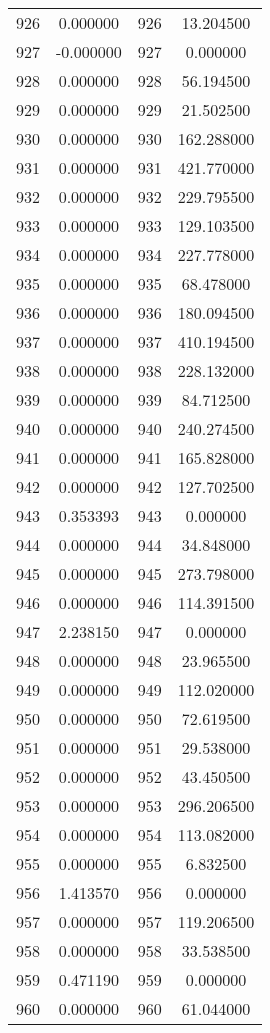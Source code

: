 \documentclass[12pt]{article}
\begin{document}
\begin{longtable}{@{}cccc@{}}
926 & 0.000000 & 926 & 13.204500 \\
927 & -0.000000 & 927 & 0.000000 \\
928 & 0.000000 & 928 & 56.194500 \\
929 & 0.000000 & 929 & 21.502500 \\
930 & 0.000000 & 930 & 162.288000 \\
931 & 0.000000 & 931 & 421.770000 \\
932 & 0.000000 & 932 & 229.795500 \\
933 & 0.000000 & 933 & 129.103500 \\
934 & 0.000000 & 934 & 227.778000 \\
935 & 0.000000 & 935 & 68.478000 \\
936 & 0.000000 & 936 & 180.094500 \\
937 & 0.000000 & 937 & 410.194500 \\
938 & 0.000000 & 938 & 228.132000 \\
939 & 0.000000 & 939 & 84.712500 \\
940 & 0.000000 & 940 & 240.274500 \\
941 & 0.000000 & 941 & 165.828000 \\
942 & 0.000000 & 942 & 127.702500 \\
943 & 0.353393 & 943 & 0.000000 \\
944 & 0.000000 & 944 & 34.848000 \\
945 & 0.000000 & 945 & 273.798000 \\
946 & 0.000000 & 946 & 114.391500 \\
947 & 2.238150 & 947 & 0.000000 \\
948 & 0.000000 & 948 & 23.965500 \\
949 & 0.000000 & 949 & 112.020000 \\
950 & 0.000000 & 950 & 72.619500 \\
951 & 0.000000 & 951 & 29.538000 \\
952 & 0.000000 & 952 & 43.450500 \\
953 & 0.000000 & 953 & 296.206500 \\
954 & 0.000000 & 954 & 113.082000 \\
955 & 0.000000 & 955 & 6.832500 \\
956 & 1.413570 & 956 & 0.000000 \\
957 & 0.000000 & 957 & 119.206500 \\
958 & 0.000000 & 958 & 33.538500 \\
959 & 0.471190 & 959 & 0.000000 \\
960 & 0.000000 & 960 & 61.044000 \\

\end{longtable}
\end{document}
